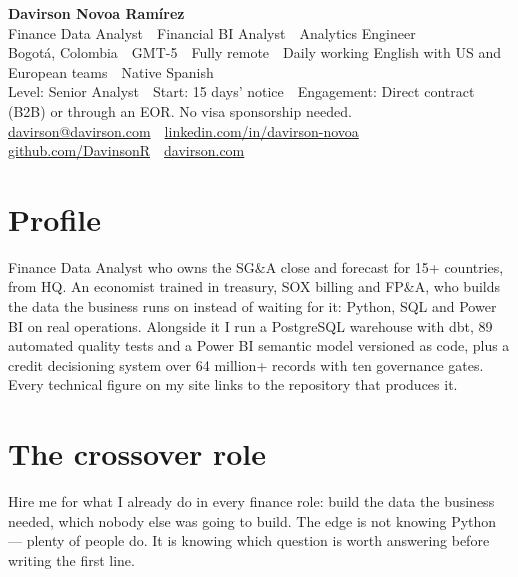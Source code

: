 \documentclass[a4paper,10pt]{article}
\begin{document}
\begin{center}
  {\Large\bfseries\color{ink} Davirson Novoa Ramírez}\\[2pt]
  {\normalsize\color{cold} Finance Data Analyst \,\textperiodcentered\, Financial BI Analyst \,\textperiodcentered\, Analytics Engineer}\\[3pt]
  {\small Bogotá, Colombia \,\textperiodcentered\, GMT-5 \,\textperiodcentered\, Fully remote \,\textperiodcentered\, Daily working English with US and European teams \,\textperiodcentered\, Native Spanish}\\[2pt]
  {\small\color{cold} Level: Senior Analyst \,\textperiodcentered\, Start: 15 days' notice \,\textperiodcentered\, Engagement: Direct contract (B2B) or through an EOR. No visa sponsorship needed.}\\[2pt]
  {\small \href{mailto:davirson@davirson.com}{davirson@davirson.com} \,\textperiodcentered\, \href{https://linkedin.com/in/davirson-novoa}{linkedin.com/in/davirson-novoa} \,\textperiodcentered\, \href{https://github.com/DavinsonR}{github.com/DavinsonR} \,\textperiodcentered\, \href{https://davirson.com/en}{davirson.com}}
\end{center}

\section*{Profile}
Finance Data Analyst who owns the SG\&A close and forecast for 15+ countries, from HQ. An economist trained in treasury, SOX billing and FP\&A, who builds the data the business runs on instead of waiting for it: Python, SQL and Power BI on real operations. Alongside it I run a PostgreSQL warehouse with dbt, 89 automated quality tests and a Power BI semantic model versioned as code, plus a credit decisioning system over 64 million+ records with ten governance gates. Every technical figure on my site links to the repository that produces it.

\section*{The crossover role}
Hire me for what I already do in every finance role: build the data the business needed, which nobody else was going to build. The edge is not knowing Python --- plenty of people do. It is knowing which question is worth answering before writing the first line.
\end{document}
